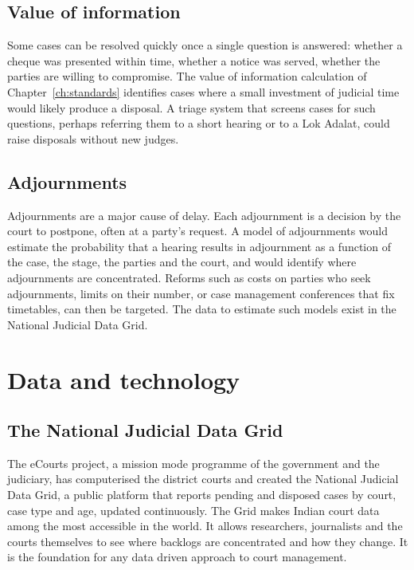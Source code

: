\subsection{Value of information}

Some cases can be resolved quickly once a single question is answered: whether a cheque was presented within time, whether a notice was served, whether the parties are willing to compromise. The value of information calculation of Chapter~\ref{ch:standards} identifies cases where a small investment of judicial time would likely produce a disposal. A triage system that screens cases for such questions, perhaps referring them to a short hearing or to a Lok Adalat, could raise disposals without new judges.

\subsection{Adjournments}

Adjournments are a major cause of delay. Each adjournment is a decision by the court to postpone, often at a party's request. A model of adjournments would estimate the probability that a hearing results in adjournment as a function of the case, the stage, the parties and the court, and would identify where adjournments are concentrated. Reforms such as costs on parties who seek adjournments, limits on their number, or case management conferences that fix timetables, can then be targeted. The data to estimate such models exist in the National Judicial Data Grid.

\section{Data and technology}

\subsection{The National Judicial Data Grid}

The eCourts project, a mission mode programme of the government and the judiciary, has computerised the district courts and created the National Judicial Data Grid, a public platform that reports pending and disposed cases by court, case type and age, updated continuously. The Grid makes Indian court data among the most accessible in the world. It allows researchers, journalists and the courts themselves to see where backlogs are concentrated and how they change. It is the foundation for any data driven approach to court management.

